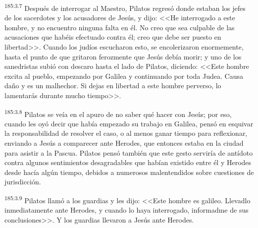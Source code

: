 \par 
\textsuperscript{185:3.7} Después de interrogar al Maestro, Pilatos regresó donde estaban los jefes de los sacerdotes y los acusadores de Jesús, y dijo: <<He interrogado a este hombre, y no encuentro ninguna falta en él. No creo que sea culpable de las acusaciones que habéis efectuado contra él; creo que debe ser puesto en libertad>>. Cuando los judíos escucharon esto, se encolerizaron enormemente, hasta el punto de que gritaron ferozmente que Jesús debía morir; y uno de los sanedristas subió con descaro hasta el lado de Pilatos, diciendo: <<Este hombre excita al pueblo, empezando por Galilea y continuando por toda Judea. Causa daño y es un malhechor. Si dejas en libertad a este hombre perverso, lo lamentarás durante mucho tiempo>>.

\par 
\textsuperscript{185:3.8} Pilatos se veía en el apuro de no saber qué hacer con Jesús; por eso, cuando les oyó decir que había empezado su trabajo en Galilea, pensó en esquivar la responsabilidad de resolver el caso, o al menos ganar tiempo para reflexionar, enviando a Jesús a comparecer ante Herodes, que entonces estaba en la ciudad para asistir a la Pascua. Pilatos pensó también que este gesto serviría de antídoto contra algunos sentimientos desagradables que habían existido entre él y Herodes desde hacía algún tiempo, debidos a numerosos malentendidos sobre cuestiones de jurisdicción.

\par 
\textsuperscript{185:3.9} Pilatos llamó a los guardias y les dijo: <<Este hombre es galileo. Llevadlo inmediatamente ante Herodes, y cuando lo haya interrogado, informadme de sus conclusiones>>. Y los guardias llevaron a Jesús ante Herodes.

